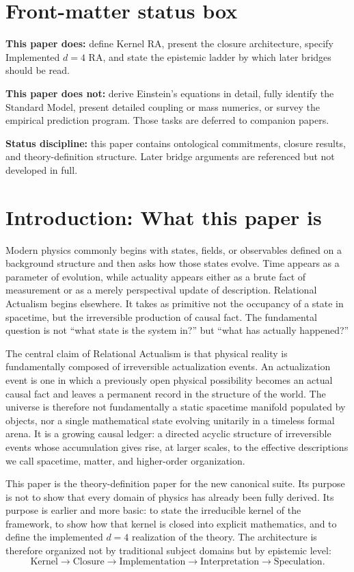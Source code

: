 \documentclass[11pt]{article}
\begin{document}
\section*{Front-matter status box}
\noindent\textbf{This paper does:} define Kernel RA, present the closure architecture, specify Implemented $d=4$ RA, and state the epistemic ladder by which later bridges should be read.

\noindent\textbf{This paper does not:} derive Einstein's equations in detail, fully identify the Standard Model, present detailed coupling or mass numerics, or survey the empirical prediction program. Those tasks are deferred to companion papers.

\noindent\textbf{Status discipline:} this paper contains ontological commitments, closure results, and theory-definition structure. Later bridge arguments are referenced but not developed in full.

\section{Introduction: What this paper is}
Modern physics commonly begins with states, fields, or observables defined on a background structure and then asks how those states evolve. Time appears as a parameter of evolution, while actuality appears either as a brute fact of measurement or as a merely perspectival update of description. Relational Actualism begins elsewhere. It takes as primitive not the occupancy of a state in spacetime, but the irreversible production of causal fact. The fundamental question is not ``what state is the system in?'' but ``what has actually happened?''

The central claim of Relational Actualism is that physical reality is fundamentally composed of irreversible actualization events. An actualization event is one in which a previously open physical possibility becomes an actual causal fact and leaves a permanent record in the structure of the world. The universe is therefore not fundamentally a static spacetime manifold populated by objects, nor a single mathematical state evolving unitarily in a timeless formal arena. It is a growing causal ledger: a directed acyclic structure of irreversible events whose accumulation gives rise, at larger scales, to the effective descriptions we call spacetime, matter, and higher-order organization.

This paper is the theory-definition paper for the new canonical suite. Its purpose is not to show that every domain of physics has already been fully derived. Its purpose is earlier and more basic: to state the irreducible kernel of the framework, to show how that kernel is closed into explicit mathematics, and to define the implemented $d=4$ realization of the theory. The architecture is therefore organized not by traditional subject domains but by epistemic level:
\[
\text{Kernel} \to \text{Closure} \to \text{Implementation} \to \text{Interpretation} \to \text{Speculation}.
\]
\end{document}
